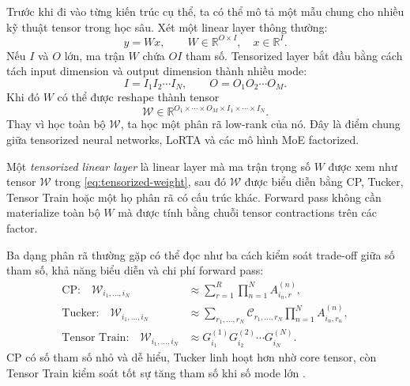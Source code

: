 Trước khi đi vào từng kiến trúc cụ thể, ta có thể mô tả một mẫu chung cho nhiều kỹ
thuật tensor trong học sâu. Xét một linear layer thông thường:
\begin{equation}
    y = Wx,\qquad W \in \mathbb{R}^{O \times I},\quad x\in\mathbb{R}^{I}.
    \label{eq:dense-linear-layer}
\end{equation}
Nếu $I$ và $O$ lớn, ma trận $W$ chứa $OI$ tham số. Tensorized layer bắt đầu bằng cách
tách input dimension và output dimension thành nhiều mode:
\begin{equation}
    I = I_1I_2\cdots I_N,\qquad
    O = O_1O_2\cdots O_M.
\end{equation}
Khi đó $W$ có thể được reshape thành tensor
\begin{equation}
    \mathcal{W}
    \in
    \mathbb{R}^{O_1 \times \cdots \times O_M \times I_1 \times \cdots \times I_N}.
    \label{eq:tensorized-weight}
\end{equation}
Thay vì học toàn bộ $\mathcal{W}$, ta học một phân rã low-rank của nó. Đây là điểm
chung giữa tensorized neural networks, LoRTA và các mô hình MoE factorized.

\begin{definition}
Một \emph{tensorized linear layer} là linear layer mà ma trận trọng số $W$ được xem như
tensor $\mathcal{W}$ trong \eqref{eq:tensorized-weight}, sau đó $\mathcal{W}$ được biểu
diễn bằng CP, Tucker, Tensor Train hoặc một họ phân rã có cấu trúc khác. Forward pass
không cần materialize toàn bộ $W$ mà được tính bằng chuỗi tensor contractions trên các
factor.
\end{definition}

Ba dạng phân rã thường gặp có thể đọc như ba cách kiểm soát trade-off giữa số tham số,
khả năng biểu diễn và chi phí forward pass:
\begin{align}
    \text{CP:}\quad
    \mathcal{W}_{i_1,\ldots,i_N}
    &\approx
    \sum_{r=1}^{R}\prod_{n=1}^{N} A^{(n)}_{i_n,r}, \label{eq:dl-cp-layer}\\
    \text{Tucker:}\quad
    \mathcal{W}_{i_1,\ldots,i_N}
    &\approx
    \sum_{r_1,\ldots,r_N}
    \mathcal{C}_{r_1,\ldots,r_N}
    \prod_{n=1}^{N} A^{(n)}_{i_n,r_n}, \label{eq:dl-tucker-layer}\\
    \text{Tensor Train:}\quad
    \mathcal{W}_{i_1,\ldots,i_N}
    &\approx
    G^{(1)}_{i_1}G^{(2)}_{i_2}\cdots G^{(N)}_{i_N}.
    \label{eq:dl-tt-layer}
\end{align}
CP có số tham số nhỏ và dễ hiểu, Tucker linh hoạt hơn nhờ core tensor, còn Tensor Train
kiểm soát tốt sự tăng tham số khi số mode lớn \cite{kolda2009tensor,oseledets2011tensor}.

